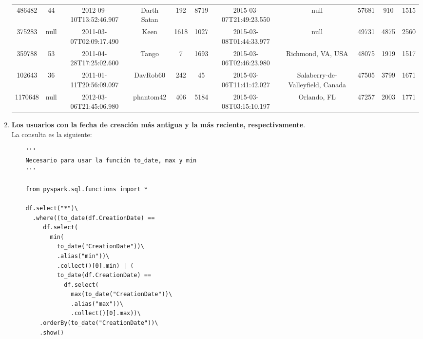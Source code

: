 \documentclass[12pt,a4paper,twoside,openright,titlepage,final]{article}
\begin{document}
\begin{enumerate}
\begin{table}[htbp!]
{\begin{tabular}{@{}ccccccccccc@{}}
			486482             & 44           & 2012-09-10T13:52:46.907 & Darth Satan          & 192                & 8719        & 2015-03-07T21:49:23.550 & null                             & 57681               & 910              & 1515           \\
			375283             & null         & 2011-03-07T02:09:17.490 & Keen                 & 1618               & 1027        & 2015-03-08T01:44:33.977 & null                             & 49731               & 4875             & 2560           \\
			359788             & 53           & 2011-04-28T17:25:02.600 & Tango                & 7                  & 1693        & 2015-03-06T02:46:23.980 & Richmond, VA, USA                & 48075               & 1919             & 1517           \\
			102643             & 36           & 2011-01-11T20:56:09.097 & DavRob60             & 242                & 45          & 2015-03-06T11:41:42.027 & Salaberry-de-Valleyfield, Canada & 47505               & 3799             & 1671           \\
			1170648            & null         & 2012-03-06T21:45:06.980 & phantom42            & 406                & 5184        & 2015-03-08T03:15:10.197 & Orlando, FL                      & 47257               & 2003             & 1771           \\ \bottomrule
			\end{tabular}%
		}
	\end{table}
		
	\item \textbf{Los usuarios con la fecha de creación más antigua y la más reciente, respectivamente}.\\
	
	La consulta es la siguiente:
	
	\begin{verbatim}
	''' 
	Necesario para usar la función to_date, max y min
	'''
	
	from pyspark.sql.functions import *
	
	df.select("*")\
	  .where((to_date(df.CreationDate) ==    
	     df.select(
	       min(
	         to_date("CreationDate"))\
	         .alias("min"))\
	         .collect()[0].min) | (
	         to_date(df.CreationDate) == 
	           df.select(
	             max(to_date("CreationDate"))\
	             .alias("max"))\
	             .collect()[0].max))\
	    .orderBy(to_date("CreationDate"))\
	    .show()
	\end{verbatim}
	

\end{enumerate}
\end{document}

